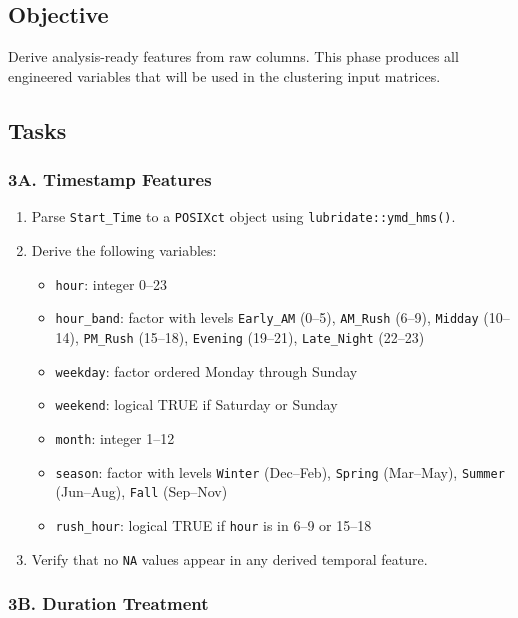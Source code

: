 \documentclass[11pt]{article}
\begin{document}
\subsection{Objective}

Derive analysis-ready features from raw columns. This phase produces all engineered variables that will be used in the clustering input matrices.

\subsection{Tasks}

\subsubsection*{3A. Timestamp Features}

\begin{enumerate}
  \item Parse \texttt{Start\_Time} to a \texttt{POSIXct} object using \texttt{lubridate::ymd\_hms()}.
  \item Derive the following variables:
  \begin{itemize}
    \item \texttt{hour}: integer 0--23
    \item \texttt{hour\_band}: factor with levels \texttt{Early\_AM} (0--5), \texttt{AM\_Rush} (6--9), \texttt{Midday} (10--14), \texttt{PM\_Rush} (15--18), \texttt{Evening} (19--21), \texttt{Late\_Night} (22--23)
    \item \texttt{weekday}: factor ordered Monday through Sunday
    \item \texttt{weekend}: logical TRUE if Saturday or Sunday
    \item \texttt{month}: integer 1--12
    \item \texttt{season}: factor with levels \texttt{Winter} (Dec--Feb), \texttt{Spring} (Mar--May), \texttt{Summer} (Jun--Aug), \texttt{Fall} (Sep--Nov)
    \item \texttt{rush\_hour}: logical TRUE if \texttt{hour} is in 6--9 or 15--18
  \end{itemize}
  \item Verify that no \texttt{NA} values appear in any derived temporal feature.
\end{enumerate}

\subsubsection*{3B. Duration Treatment}
\end{document}
